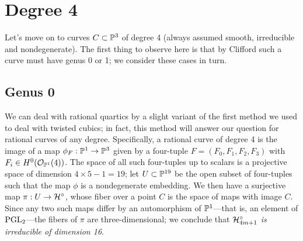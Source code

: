 %
%
%
%
%
%

\section{Degree 4}

Let's move on to curves $C \subset \PP^3$ of degree 4 (always assumed smooth, irreducible and nondegenerate). The first thing to observe here is that by Clifford such a curve must have genus 0 or 1; we consider these cases in turn.

\subsection{Genus 0}\label{degree 4 genus 0}

We can deal with rational quartics by a slight variant of the first method we used to deal with twisted cubics; in fact, this method will answer our question for rational curves of any degree. Specifically, a rational curve of degree 4 is the image of a map $\phi_F : \PP^1 \to \PP^3$ given by a four-tuple $F = (F_0,F_1,F_2,F_3)$ with $F_i \in H^0(\cO_{\PP^1}(4))$. The space of all such four-tuples up to scalars is a projective space of dimension $4 \times 5 - 1 = 19$; let $U \subset \PP^{19}$ be the open subset of four-tuples such that the map $\phi$ is a nondegenerate embedding. We then have a surjective map $\pi : U \to \cH^\circ$, whose fiber over a point $C$ is the space of maps with image $C$. Since any two such maps differ by an automorphism of $\PP^1$---that is, an element of $\PGL_2$---the fibers of $\pi$ are three-dimensional; we conclude that \emph{$\cH^\circ_{4m+1}$ is irreducible of dimension 16}.

